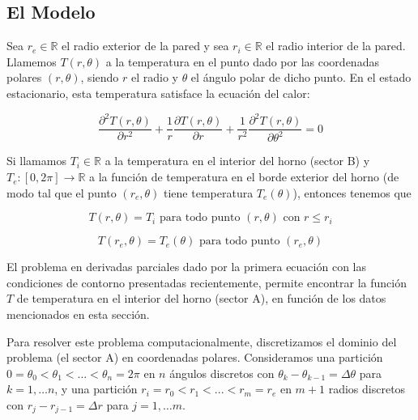 \begin{appendices}
    \subsection{El Modelo}

      Sea $r_e \in \mathbb{R}$ el radio exterior de la pared y sea $r_i \in \mathbb{R}$ el radio interior de la pared. Llamemos $T(r, \theta)$ a la temperatura en el punto dado por las coordenadas polares $(r, \theta)$, siendo $r$ el radio y $\theta$ el ángulo polar de dicho punto. En el estado estacionario, esta temperatura satisface la ecuación del calor:

      \begin{equation} \label{eq:en1}
        \frac{\partial^2 T(r, \theta)}{\partial r^2} + \frac{1}{r} \frac{\partial T(r, \theta)}{\partial r} + \frac{1}{r^2} \frac{\partial^2 T(r, \theta)}{\partial \theta^2} = 0
      \end{equation}

      Si llamamos $T_i \in \mathbb{R}$ a la temperatura en el interior del horno (sector B) y $T_e : [0, 2\pi] \to \mathbb{R}$ a la función de temperatura en el borde exterior del horno (de modo tal que el punto $(r_e, \theta)$ tiene temperatura $T_e(\theta)$), entonces tenemos que

      \begin{equation} \label{eq:en2}
        T(r, \theta) = T_i \text{ para todo punto } (r, \theta) \text{ con } r \leq r_i
      \end{equation}

      \begin{equation} \label{eq:en3}
        T(r_e, \theta) = T_e(\theta) \text{ para todo punto } (r_e, \theta)
      \end{equation}

      El problema en derivadas parciales dado por la primera ecuación con las condiciones de contorno presentadas recientemente, permite encontrar la función $T$ de temperatura en el interior del horno (sector A), en función de los datos mencionados en esta sección.

      Para resolver este problema computacionalmente, discretizamos el dominio del problema (el sector A) en coordenadas polares. Consideramos una partición $0 = \theta_0 < \theta_1 < ... < \theta_n = 2\pi$ en $n$ ángulos discretos con $\theta_k - \theta_{k-1} = \Delta \theta$ para $k = 1, \dots n$, y una partición $r_i = r_0 < r_1 < ... < r_m = r_e$ en $m + 1$ radios discretos con $r_j - r_{j-1} = \Delta r$ para $j = 1, \dots m$.


\end{appendices}

